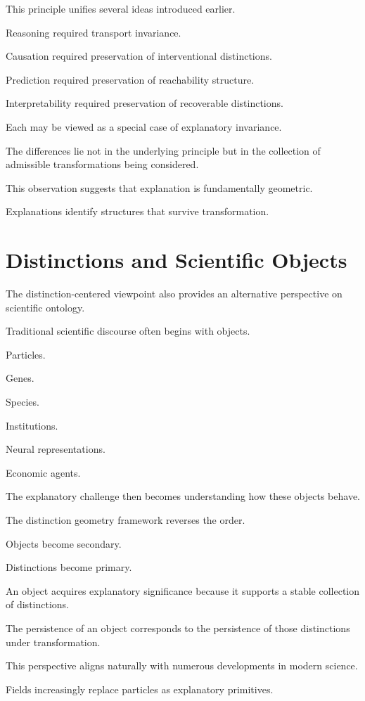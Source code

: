 \documentclass[11pt,oneside,openany]{book}
\begin{document}
This principle unifies several ideas introduced earlier.

Reasoning required transport invariance.

Causation required preservation of interventional distinctions.

Prediction required preservation of reachability structure.

Interpretability required preservation of recoverable distinctions.

Each may be viewed as a special case of explanatory invariance.

The differences lie not in the underlying principle but in the collection of admissible transformations being considered.

This observation suggests that explanation is fundamentally geometric.

Explanations identify structures that survive transformation.

\section{Distinctions and Scientific Objects}

The distinction-centered viewpoint also provides an alternative perspective on scientific ontology.

Traditional scientific discourse often begins with objects.

Particles.

Genes.

Species.

Institutions.

Neural representations.

Economic agents.

The explanatory challenge then becomes understanding how these objects behave.

The distinction geometry framework reverses the order.

Objects become secondary.

Distinctions become primary.

An object acquires explanatory significance because it supports a stable collection of distinctions.

The persistence of an object corresponds to the persistence of those distinctions under transformation.

This perspective aligns naturally with numerous developments in modern science.

Fields increasingly replace particles as explanatory primitives.
\end{document}
